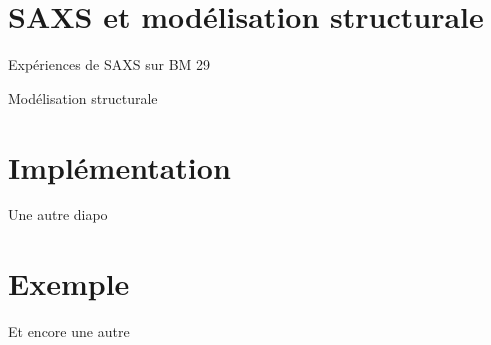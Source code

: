 \documentclass{beamer}
\begin{document}
\section{SAXS et mod\'elisation structurale}

\begin{frame}{Exp\'eriences de SAXS sur BM 29}
\lipsum[1]
\end{frame}

\begin{frame}{Mod\'elisation structurale}
\lipsum[1]
\end{frame}

\section{Impl\'ementation}%

\begin{frame}{Une autre diapo}
\lipsum[1]
\end{frame}


\section{Exemple}%

\begin{frame}{Et encore une autre}
\lipsum[1]
\end{frame}
\end{document}
